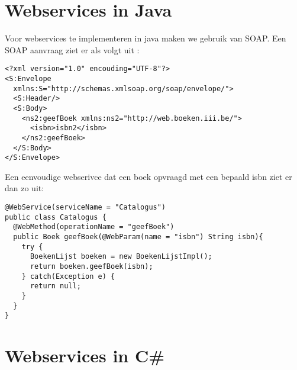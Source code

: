 \documentclass{report}
\begin{document}
\section{Webservices in Java}
Voor webservices te implementeren in java maken we gebruik van SOAP. Een SOAP aanvraag ziet er als volgt uit :
\begin{lstlisting}
<?xml version="1.0" encouding="UTF-8"?>
<S:Envelope 
  xmlns:S="http://schemas.xmlsoap.org/soap/envelope/">
  <S:Header/>
  <S:Body>
    <ns2:geefBoek xmlns:ns2="http://web.boeken.iii.be/">
      <isbn>isbn2</isbn>
    </ns2:geefBoek>
  </S:Body>
</S:Envelope>
\end{lstlisting}

Een eenvoudige webserivce dat een boek opvraagd met een bepaald isbn ziet er dan zo uit:
\begin{lstlisting}
@WebService(serviceName = "Catalogus")
public class Catalogus {
  @WebMethod(operationName = "geefBoek")
  public Boek geefBoek(@WebParam(name = "isbn") String isbn){
    try {
      BoekenLijst boeken = new BoekenLijstImpl();
      return boeken.geefBoek(isbn);
    } catch(Exception e) {
      return null;
    }
  }
}
\end{lstlisting}
\section{Webservices in C\#}
\end{document}
